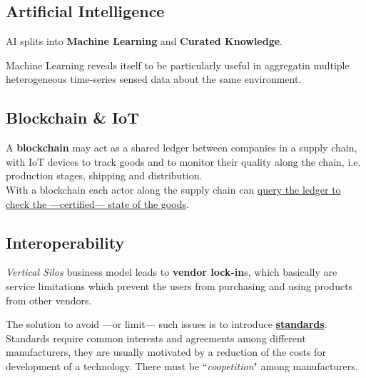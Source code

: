 \subsection{Artificial Intelligence}
AI splits into \textbf{Machine Learning} and \textbf{Curated Knowledge}.

Machine Learning reveals itself to be particularly useful in aggregatin multiple heterogeneous time-series sensed data about the same environment.


\subsection{Blockchain \& IoT}
A \textbf{blockchain} may act as a shared ledger between companies in a supply chain, with IoT devices to track goods and to monitor their quality along the chain, i.e. production stages, shipping and distribution.\\
With a blockchain each actor along the supply chain can \ul{query the ledger to check the ---certified--- state of the goods}.

\subsection{Interoperability}

\textit{Vertical Silos} business model leads to \textbf{vendor lock-in}s, which basically are service limitations which prevent the users from purchasing and using products from other vendors.
\nl
\nl

The solution to avoid ---or limit--- such issues is to introduce \ul{\textbf{standards}}.
Standards require common interests and agreements among different manufacturers, they are usually motivated by a reduction of the costs for development of a technology.
There must be ``\textit{coopetition}" among manufacturers.

